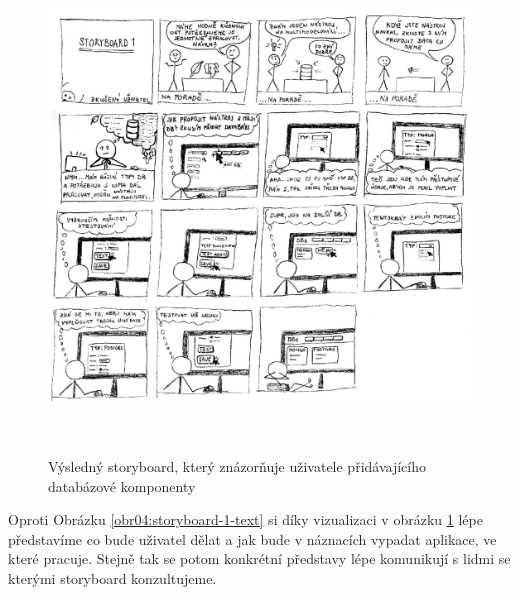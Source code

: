 \begin{figure}[htb]
    \centering
    \includegraphics[height=130mm]{../img/storyboard-1}
    \caption{\centering Výsledný storyboard, který znázorňuje uživatele přidávajícího databázové komponenty}
    \label{obr04:storyboard-1}
\end{figure}

Oproti Obrázku \ref{obr04:storyboard-1-text} si díky vizualizaci v obrázku \ref{obr04:storyboard-1} lépe představíme co bude uživatel dělat a jak bude v náznacích vypadat aplikace, ve které pracuje. Stejně tak se potom konkrétní představy lépe komunikují s lidmi se kterými storyboard konzultujeme.
